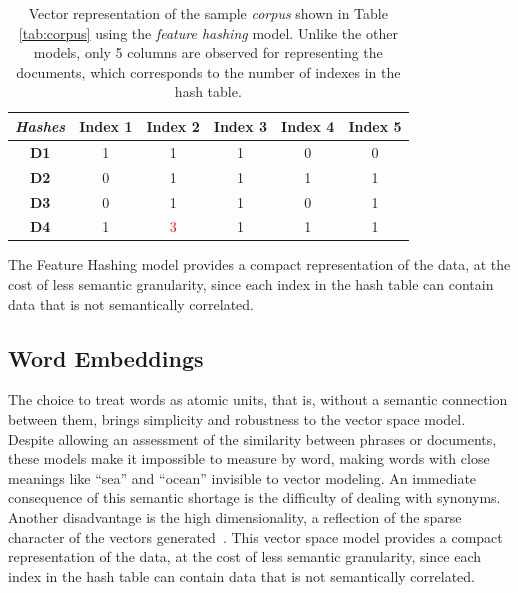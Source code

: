\documentclass{ieeeaccess}
\begin{document}
\begin{table}[h]
\centering
\caption{Vector representation of the sample \textit{corpus} shown in Table \ref{tab:corpus} using the \textit{feature hashing} model. Unlike the other models, only 5 columns are observed for representing the documents, which corresponds to the number of indexes in the hash table.}
\footnotesize
\begin{tabular}{cccccc}
\textbf{\textit{Hashes}} & \textbf{Index 1} & \textbf{Index 2} & \textbf{Index 3} & \textbf{Index 4} & \textbf{Index 5} \\ 
\hline\hline
\textbf{D1}     & 1  &   1   &   1   &   0   & 0\\ 
\hline
\textbf{D2}     & 0  &   1   &   1   &   1   & 1\\ 
\hline
\textbf{D3}     & 0  &   1   &   1   &   0   & 1\\ 
\hline
\textbf{D4}     & 1  &   \textcolor{red}{3}   &   1   &   1   & 1
\end{tabular}
\label{tab:hash}
\end{table}

The Feature Hashing model provides a compact representation of the data, at the cost of less semantic granularity, since each index in the hash table can contain data that is not semantically correlated.



\subsection{Word Embeddings}

The choice to treat words as atomic units, that is, without a semantic connection between them, brings simplicity and robustness to the vector space model. Despite allowing an assessment of the similarity between phrases or documents, these models make it impossible to measure by word, making words with close meanings like ``sea'' and ``ocean'' invisible to vector modeling. An immediate consequence of this semantic shortage is the difficulty of dealing with synonyms. Another disadvantage is the high dimensionality, a reflection of the sparse character of the vectors generated~\cite {camacho2018word, mikolov2013efficient}. This vector space model provides a compact representation of the data, at the cost of less semantic granularity, since each index in the hash table can contain data that is not semantically correlated.
\end{document}
